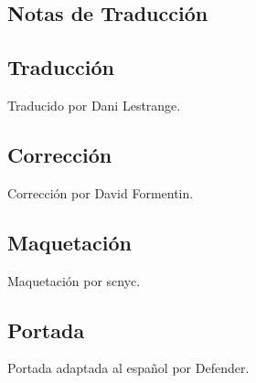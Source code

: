 \begin{center}
\section*{Notas de Traducción}
\end{center}

\subsection*{Traducción}\label{traducciuxf3n}
Traducido por Dani Lestrange.

\subsection*{Corrección}\label{correcciuxf3n}
Corrección por David Formentin.

\subsection*{Maquetación}\label{maquetaciuxf3n}
Maquetación por scnyc.

\subsection*{Portada}\label{portada}
Portada adaptada al español por Defender.
